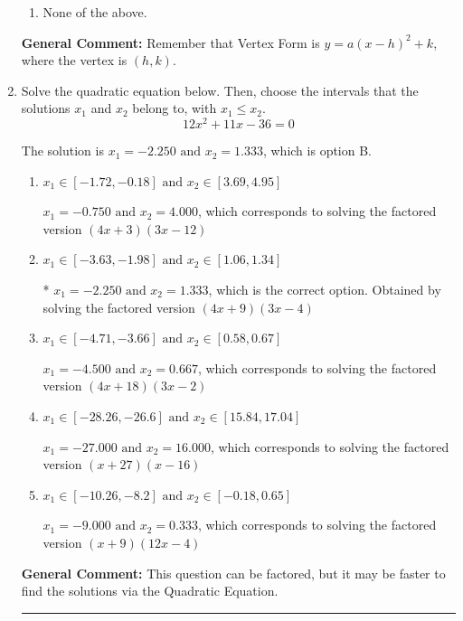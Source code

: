 \documentclass{extbook}[14pt]
\newcommand{\litem}[1]{\item #1

\rule{\textwidth}{0.4pt}}
\begin{document}
\begin{enumerate}
{\begin{enumerate}[label=\Alph*.]
\item None of the above.\end{enumerate}
\textbf{General Comment:} Remember that Vertex Form is $y = a(x-h)^2+k$, where the vertex is $(h, k)$.
}
\litem{
Solve the quadratic equation below. Then, choose the intervals that the solutions $x_1$ and $x_2$ belong to, with $x_1 \leq x_2$.
\[ 12x^{2} +11 x -36 = 0 \]

The solution is \( x_1 = -2.250 \text{ and } x_2 = 1.333 \), which is option B.\begin{enumerate}[label=\Alph*.]
\item \( x_1 \in [-1.72, -0.18] \text{ and } x_2 \in [3.69, 4.95] \)

$x_1 = -0.750 \text{ and } x_2 = 4.000$, which corresponds to solving the factored version $(4x + 3)(3x -12)$
\item \( x_1 \in [-3.63, -1.98] \text{ and } x_2 \in [1.06, 1.34] \)

* $x_1 = -2.250 \text{ and } x_2 = 1.333$, which is the correct option. Obtained by solving the factored version $(4x + 9)(3x -4)$
\item \( x_1 \in [-4.71, -3.66] \text{ and } x_2 \in [0.58, 0.67] \)

$x_1 = -4.500 \text{ and } x_2 = 0.667$, which corresponds to solving the factored version $(4x + 18)(3x -2)$
\item \( x_1 \in [-28.26, -26.6] \text{ and } x_2 \in [15.84, 17.04] \)

$x_1 = -27.000 \text{ and } x_2 = 16.000$, which corresponds to solving the factored version $(x + 27)(x -16)$
\item \( x_1 \in [-10.26, -8.2] \text{ and } x_2 \in [-0.18, 0.65] \)

$x_1 = -9.000 \text{ and } x_2 = 0.333$, which corresponds to solving the factored version $(x + 9)(12x -4)$
\end{enumerate}

\textbf{General Comment:} This question can be factored, but it may be faster to find the solutions via the Quadratic Equation.
}
\end{enumerate}
\end{document}
